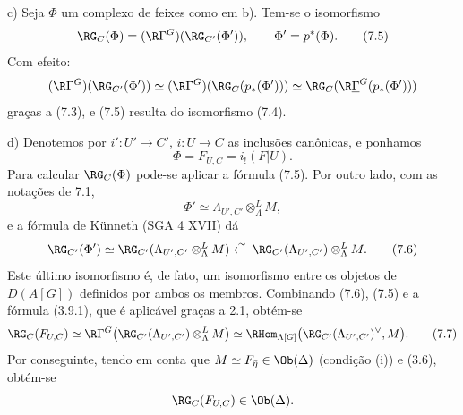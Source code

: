 c) Seja $\Phi$ um complexo de feixes como em b). Tem-se o isomorfismo
\[
\RG_C(\Phi)=(\R\Gamma^G)(\RG_{C'}(\Phi')),
\qquad \Phi'=p^*(\Phi).
\tag{7.5}
\]
Com efeito:
\[
(\R\Gamma^G)(\RG_{C'}(\Phi'))
\simeq
(\R\Gamma^G)(\RG_C(p_*(\Phi')))
\simeq
\RG_C(\R\underline{\Gamma}^G(p_*(\Phi')))
\]
graças a (7.3), e (7.5) resulta do isomorfismo (7.4).

d) Denotemos por $i':U'\to C'$, $i:U\to C$ as inclusões canônicas, e ponhamos
\[
\Phi=F_{U,C}=i_!(F|U).
\]
Para calcular $\RG_C(\Phi)$ pode-se aplicar a fórmula (7.5). Por outro lado, com as notações de 7.1,
\[
\Phi'\simeq \Lambda_{U',C'}\otimes_\Lambda^L M,
\]
e a fórmula de Künneth (SGA 4 XVII) dá
\[
\RG_{C'}(\Phi')
\simeq
\RG_{C'}(\Lambda_{U',C'}\otimes_\Lambda^L M)
\xleftarrow{\sim}
\RG_{C'}(\Lambda_{U',C'})\otimes_\Lambda^L M.
\tag{7.6}
\]
Este último isomorfismo é, de fato, um isomorfismo entre os objetos de $D(A[G])$ definidos por ambos os membros. Combinando (7.6), (7.5) e a fórmula (3.9.1), que é aplicável graças a 2.1, obtém-se
\[
\RG_C(F_{U,C})
\simeq
\R\Gamma^G\bigl(\RG_{C'}(\Lambda_{U',C'})\otimes_\Lambda^L M\bigr)
\simeq
\RHom_{\Lambda[G]}\bigl(\RG_{C'}(\Lambda_{U',C'})^\vee,M\bigr).
\tag{7.7}
\]
Por conseguinte, tendo em conta que $M\simeq F_{\bar\eta}\in\Ob(\Delta)$ (condição (i)) e (3.6), obtém-se
\[
\RG_C(F_{U,C})\in\Ob(\Delta).
\]
